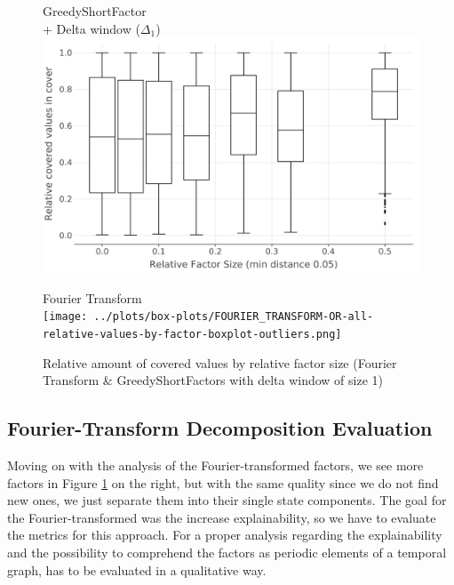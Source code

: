 \begin{figure}[b]
	\begin{minipage}[h]{0.49\linewidth}
		\centering
		GreedyShortFactor\\
		+ Delta window ($\Delta_1$)
		\includegraphics[width=\linewidth]{../delta-plots/box-plots/GREEDY_SHORT_FACTORS-OR-all-relative-values-by-factor-boxplot-dist.png}
	\end{minipage}
	\begin{minipage}[h]{0.49\linewidth}
		\centering
		Fourier Transform\\
		\hfill \break
		\texttt{[image: ../plots/box-plots/FOURIER\_TRANSFORM-OR-all-relative-values-by-factor-boxplot-outliers.png]}
	\end{minipage}
	\caption{Relative amount of covered values by relative factor size (Fourier Transform \& GreedyShortFactors with delta window of size 1)}
	\label{fig:eval:greedy-short-factors-all-factors-box-plot-delta}
\end{figure}

\subsection{Fourier-Transform Decomposition Evaluation}
\label{ch:Evaluation:decomposition-quality:fourier}
Moving on with the analysis of the Fourier-transformed factors, we see more factors in Figure \ref{fig:eval:greedy-short-factors-all-factors-box-plot-delta} on the right, but with the same quality since we do not find new ones, we just separate them into their  single state components.
The goal for the Fourier-transformed \orDecomp was the increase explainability, so we have to evaluate the metrics for this approach.
For a proper analysis regarding the explainability and the possibility to comprehend the factors as periodic elements of a temporal graph, has to be evaluated in a qualitative way.

